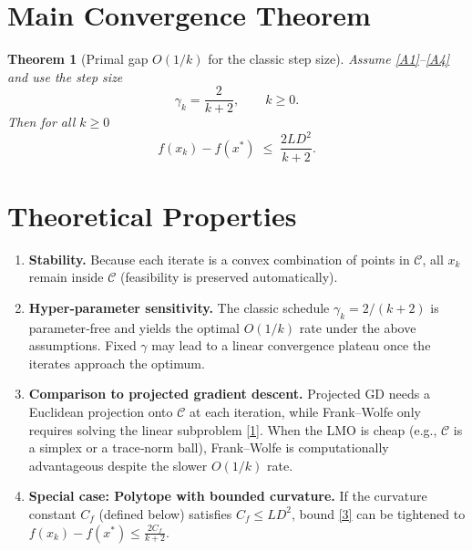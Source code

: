 \documentclass{article}
\newtheorem{theorem}{Theorem}
\begin{document}
\section*{Main Convergence Theorem}
\begin{theorem}[Primal gap $O(1/k)$ for the classic step size]\label{thm:fw}
Assume \ref{A1}–\ref{A4} and use the step size
\[
\gamma_{k}=\frac{2}{k+2},\qquad k\ge0 .
\]
Then for all $k\ge0$
\[
f(x_{k})-f(x^{*})\;\le\;\frac{2L D^{2}}{k+2}.
\tag{3}
\]
\end{theorem}

\section*{Theoretical Properties}
\begin{enumerate}[label=\textbf{P\arabic*.},leftmargin=*]
\item \textbf{Stability.} Because each iterate is a convex combination of points in $\mathcal C$, all $x_{k}$ remain inside $\mathcal C$ (feasibility is preserved automatically).

\item \textbf{Hyper‑parameter sensitivity.}  
The classic schedule $\gamma_{k}=2/(k+2)$ is parameter‑free and yields the optimal $O(1/k)$ rate under the above assumptions. Fixed $\gamma$ may lead to a linear convergence plateau once the iterates approach the optimum.

\item \textbf{Comparison to projected gradient descent.}  
Projected GD needs a Euclidean projection onto $\mathcal C$ at each iteration, while Frank–Wolfe only requires solving the linear subproblem \eqref{1}. When the LMO is cheap (e.g., $\mathcal C$ is a simplex or a trace‑norm ball), Frank–Wolfe is computationally advantageous despite the slower $O(1/k)$ rate.

\item \textbf{Special case: Polytope with bounded curvature.}  
If the curvature constant $C_{f}$ (defined below) satisfies $C_{f}\le LD^{2}$, bound \eqref{3} can be tightened to $f(x_{k})-f(x^{*})\le \frac{2C_{f}}{k+2}$.
\end{enumerate}
\end{document}
